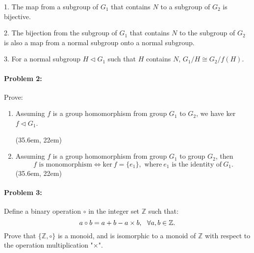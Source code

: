 \documentclass[12pt]{scrartcl}
\begin{document}
{{\begin{enumerate}[label=(\alph*)]
\begin{spacing}{1.3}
\setlength{\leftskip}{20pt}1. The map from a subgroup of $G_1$ that contains $N$ to a subgroup of $G_2$ is bijective.

2. The bijection from the subgroup of $G_1$ that contains $N$ to the subgroup of $G_2$ is also a map from a normal subgroup onto a normal subgroup.

3. For a normal subgroup $H \lhd G_1$ such that $H$ contains $N$, $G_1/H \cong G_2/f(H).$
\end{spacing}

\vspace{-0.2em}

	\end{enumerate}


\newpage

\paragraph*{Problem 2: }Prove:

\begin{enumerate}[label=(\alph*)]
	\item Assuming $f$ is a group homomorphism from group $G_1$ to $G_2$, we have ker $f \lhd G_1$.

\vspace{0.5em}
	\framebox(35.6em, 22em){}

\vspace{0.5em}

	\item Assuming $f$ is a group homomorphism from group $G_1$ to group $G_2$, then $$f \text{~is monomorphism} \iff \text{ker} ~ f = \{e_1\}, \text{~where} ~ e_1 \text{~is the identity of} ~ G_1.$$
		\framebox(35.6em, 22em){}
\end{enumerate}

\paragraph*{Problem 3: }\begin{spacing}{1.5}Define a binary operation $\circ$ in the integer set $\mathbb{Z}$ such that: \vspace{-1em}
$$a \circ b = a + b - a \times b, ~~\forall a, b \in \mathbb{Z}.\vspace{-1em}$$
Prove that $\{\mathbb{Z}, \circ\}$ is a monoid, and is isomorphic to a monoid of $\mathbb{Z}$ with respect to the operation multiplication "$\times$".\end{spacing}

}}
\end{document}
